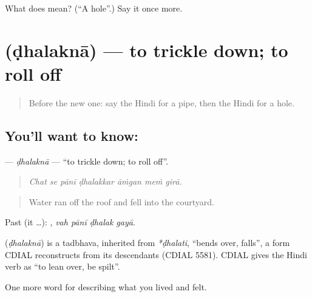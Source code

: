 \begin{tcolorbox}[breakable,colback=teal!4,colframe=teal!35!black,title={Before you move on}]
What does  mean? (\textquotedblleft{}A hole\textquotedblright{}.) Say it once more.
\end{tcolorbox}
\section[\texorpdfstring{\hi{ढलकना} (ḍhalaknā)}{ढलकना (ḍhalaknā)}]{ (ḍhalaknā) — to trickle down; to roll off}

\label{lesson:HI-C516-dhalakna}



\begin{quote}
Before the new one: say the Hindi for a pipe, then the Hindi for a hole.
\end{quote}

\subsection*{You'll want to know: }
\textbf{} — \emph{ḍhalaknā} — \textquotedblleft{}to trickle down; to roll off\textquotedblright{}.

\begin{quote}
      
\end{quote}

\begin{quote}
\emph{Chat se pānī ḍhalakkar āṁgan meṁ girā.}
\end{quote}

\begin{quote}
Water ran off the roof and fell into the courtyard.
\end{quote}

Past (it …):    , \emph{vah pānī ḍhalak gayā}.

\begin{cousinweb}
\textbf{} (\emph{ḍhalaknā}) is a tadbhava, inherited from \emph{*ḍhalati}, \textquotedblleft{}bends over, falls\textquotedblright{}, a form CDIAL reconstructs from its descendants (CDIAL 5581). CDIAL gives the Hindi verb as \textquotedblleft{}to lean over, be spilt\textquotedblright{}.
\end{cousinweb}

\begin{grammarlens}[title={What you've built}]
One more word for describing what you lived and felt.
\end{grammarlens}


